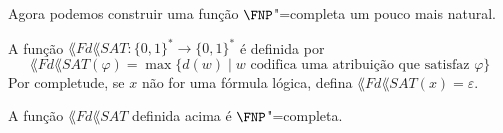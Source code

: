 Agora podemos construir uma função $\FNP$"=completa um pouco mais natural.
\newcommand{\FdSAT}{{\lang{F}d\lang{SAT}}}
\begin{definition}
    A função $\FdSAT: \{0, 1\}^* \to \{0, 1\}^*$ é definida por
    \begin{equation*}
        \FdSAT(\varphi) = \max\{d(w) \mid
            \text{$w$ codifica uma atribuição que satisfaz $\varphi$}
        \}
    \end{equation*}
    Por completude, se $x$ não for uma fórmula lógica,
    defina $\FdSAT(x) = \varepsilon$.
\end{definition}

\begin{theorem}
    A função $\FdSAT$ definida acima é $\FNP$"=completa.
\end{theorem}

